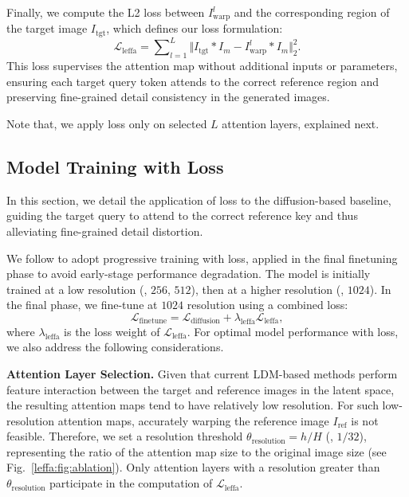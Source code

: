 Finally, we compute the L2 loss between ${I_{\text{warp}}^{l}}$ and the corresponding region of the target image $I_{\text{tgt}}$, which defines our \leffa{} loss formulation:
\begin{equation}
     \mathcal{L}_{\text{leffa}} = \sum\nolimits_{l=1}^{L}  \Vert I_{\text{tgt}} * I_m - {I_{\text{warp}}^{l}} * I_m \Vert_{2}^{2}.
\end{equation}
This loss supervises the attention map without additional inputs or parameters, ensuring each target query token attends to the correct reference region and preserving fine-grained detail consistency in the generated images.

Note that, we apply \leffa{} loss only on selected $L$ attention layers, explained next.


\subsection{Model Training with \textbf{\leffa{}} Loss}
\label{leffa:sec:training}
In this section, we detail the application of \leffa{} loss to the diffusion-based baseline, guiding the target query to attend to the correct reference key and thus alleviating fine-grained detail distortion.

We follow \citet{zhu2024m} to adopt progressive training with \leffa{} loss, applied in the final finetuning phase to avoid early-stage performance degradation.
The model is initially trained at a low resolution (\eg, $256$, $512$), then at a higher resolution (\eg, $1024$).
In the final phase, we fine-tune at $1024$ resolution using a combined loss:
\begin{equation}
    \mathcal{L}_{\text{finetune}} = \mathcal{L}_{\text{diffusion}} + \lambda_\text{leffa} \mathcal{L}_{\text{leffa}},
\end{equation}
where $\lambda_\text{leffa}$ is the loss weight of $\mathcal{L}_{\text{leffa}}$.
For optimal model performance with \leffa{} loss, we also address the following considerations.

\noindent \textbf{Attention Layer Selection.}
Given that current LDM-based methods perform feature interaction between the target and reference images in the latent space, the resulting attention maps tend to have relatively low resolution.
For such low-resolution attention maps, accurately warping the reference image $I_{\text{ref}}$ is not feasible.
Therefore, we set a resolution threshold $\theta_{\text{resolution}} = h/H$ (\eg, $1/32$), representing the ratio of the attention map size to the original image size (see Fig.~\ref{leffa:fig:ablation}).
Only attention layers with a resolution greater than $\theta_{\text{resolution}}$ participate in the computation of $\mathcal{L}_{\text{leffa}}$.

